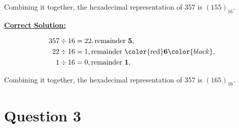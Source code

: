 \documentclass[12pt]{article}
\begin{document}
\begin{enumerate}[a.]
    Combining it together, the hexadecimal representation of 357 is $(155)_{16}$.

    \begin{mdframed}
        \underline{\textbf{Correct Solution:}}

        \bigskip

        \begin{align*}
            357 \div 16 &= 22, \text{remainder \textbf{5}},\\
            22 \div 16 &= 1, \text{remainder \color{red}\textbf{6}}\color{black},\\
            1 \div 16 &= 0, \text{remainder \textbf{1}},\\
        \end{align*}

        Combining it together, the hexadecimal representation of 357 is \color{red}\textbf{$(165)_{16}$}\color{black}.

    \end{mdframed}

\end{enumerate}

\section*{Question 3}
\end{document}
